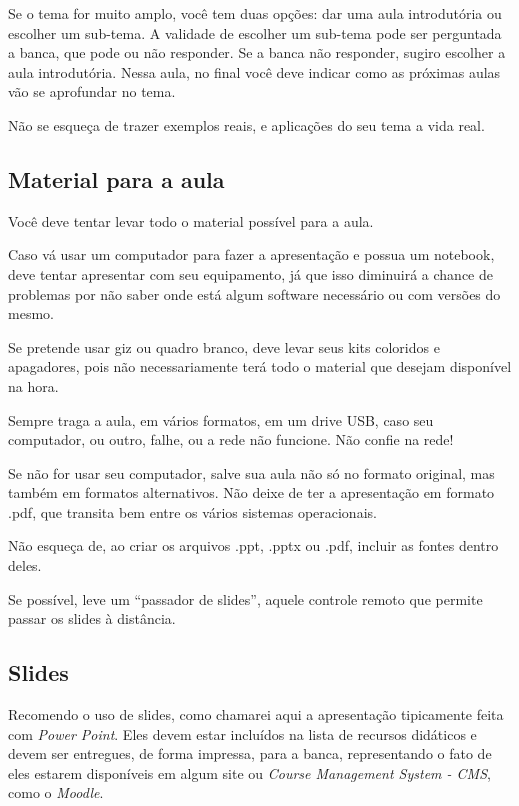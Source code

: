\documentclass[12pt]{article}
\begin{document}
Se o tema for muito amplo, você tem duas opções: dar uma aula introdutória ou escolher um sub-tema.
A validade de escolher um sub-tema pode ser perguntada a banca, que pode ou não responder.
Se a banca não responder, sugiro escolher a aula introdutória.
Nessa aula, no final você deve indicar como as próximas aulas vão se aprofundar no tema.

Não se esqueça de trazer exemplos reais, e aplicações do seu tema a vida real.



\subsection{Material para a aula}

Você deve tentar levar todo o material possível para a aula.

Caso vá usar um computador para fazer a apresentação e possua um notebook, deve tentar apresentar com seu equipamento, já que isso diminuirá a chance de problemas por não saber onde está algum software necessário ou com versões do mesmo.

Se pretende usar giz ou quadro branco, deve levar seus kits coloridos e apagadores, pois não necessariamente terá todo o material que desejam disponível na hora.


Sempre traga a aula, em vários formatos, em um drive USB, caso seu computador, ou outro, falhe, ou a rede não funcione. Não confie na rede!

Se não for usar seu computador, salve sua aula não só no formato original, mas também em formatos alternativos.
Não deixe de ter a apresentação em formato .pdf, que transita bem entre os vários sistemas operacionais.

Não esqueça de, ao criar os arquivos .ppt, .pptx ou .pdf, incluir as fontes dentro deles.

Se possível, leve um ``passador de slides'', aquele controle remoto que permite passar os slides à distância.

\subsection{Slides}

Recomendo o uso de slides, como chamarei aqui a apresentação tipicamente feita com \textit{Power Point}.
Eles devem estar incluídos na lista de recursos didáticos e devem ser entregues, de forma impressa, para a banca, representando o fato de eles estarem disponíveis em algum site ou \textit{Course Management System - CMS}, como o \textit{Moodle}.
\end{document}
